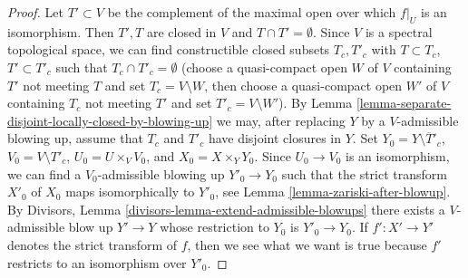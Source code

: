 \documentclass[10pt,a4paper]{amsart}
\theoremstyle{plain}
\theoremstyle{definition}
\theoremstyle{remark}
\numberwithin{equation}{subsection}
\begin{document}
\begin{proof}
Let $T' \subset V$ be the complement of the maximal open over which
$f|_U$ is an isomorphism. Then $T', T$ are closed in $V$ and
$T \cap T' = \emptyset$. Since $V$ is a spectral topological
space, we can find constructible closed subsets $T_c, T'_c$
with $T \subset T_c$, $T' \subset T'_c$ such that
$T_c \cap T'_c = \emptyset$ (choose a quasi-compact
open $W$ of $V$ containing $T'$ not meeting $T$
and set $T_c = V \setminus W$, then choose a quasi-compact
open $W'$ of $V$ containing $T_c$ not meeting $T'$
and set $T'_c = V \setminus W'$).
By Lemma \ref{lemma-separate-disjoint-locally-closed-by-blowing-up}
we may, after replacing $Y$ by a $V$-admissible blowing up,
assume that $T_c$ and $T'_c$ have disjoint closures in $Y$.
Set $Y_0 = Y \setminus \overline{T}'_c$, $V_0 = V \setminus T'_c$,
$U_0 = U \times_V V_0$, and $X_0 = X \times_Y Y_0$.
Since $U_0 \to V_0$ is an isomorphism, we can find a
$V_0$-admissible blowing up $Y'_0 \to Y_0$ such that the
strict transform $X'_0$ of $X_0$ maps isomorphically to $Y'_0$, see
Lemma \ref{lemma-zariski-after-blowup}.
By Divisors, Lemma \ref{divisors-lemma-extend-admissible-blowups}
there exists a $V$-admissible blow up $Y' \to Y$ whose restriction
to $Y_0$ is $Y'_0 \to Y_0$. If $f' : X' \to Y'$ denotes the
strict transform of $f$, then we see what we want is true because
$f'$ restricts to an isomorphism over $Y'_0$.
\end{proof}
\end{document}
